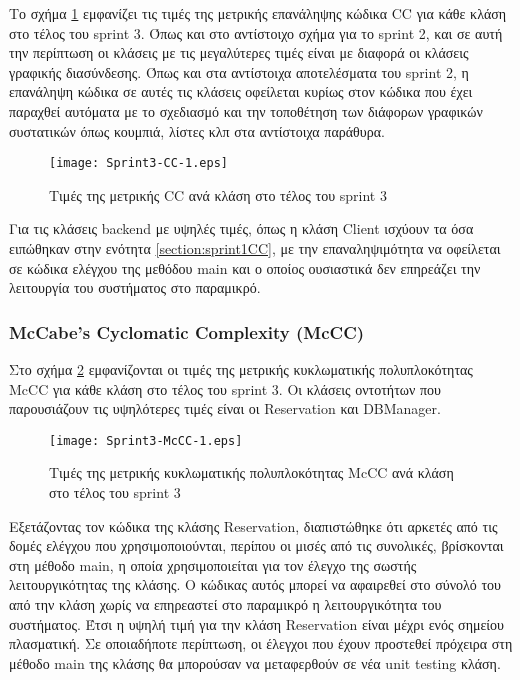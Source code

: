 Το σχήμα \ref{fig:sprint3CC} εμφανίζει τις τιμές της μετρικής επανάληψης
κώδικα CC για κάθε κλάση στο τέλος του sprint 3. Όπως και στο αντίστοιχο
σχήμα για το sprint 2, και σε αυτή την περίπτωση οι κλάσεις με τις
μεγαλύτερες τιμές είναι με διαφορά οι κλάσεις γραφικής διασύνδεσης. Όπως
και στα αντίστοιχα αποτελέσματα του sprint 2, η επανάληψη κώδικα σε
αυτές τις κλάσεις οφείλεται κυρίως στον κώδικα που έχει παραχθεί
αυτόματα με το σχεδιασμό και την τοποθέτηση των διάφορων γραφικών
συστατικών όπως κουμπιά, λίστες κλπ στα αντίστοιχα παράθυρα.

\begin{figure}
\centering
\texttt{[image: Sprint3-CC-1.eps]}
\caption{Τιμές της μετρικής CC ανά κλάση στο τέλος του sprint 3}
\label{fig:sprint3CC}
\end{figure}

Για τις κλάσεις backend με υψηλές τιμές, όπως η κλάση Client ισχύουν τα
όσα ειπώθηκαν στην ενότητα \ref{section:sprint1CC}, με την
επαναληψιμότητα να οφείλεται σε κώδικα ελέγχου της μεθόδου main και ο
οποίος ουσιαστικά δεν επηρεάζει την λειτουργία του συστήματος στο
παραμικρό.

\subsubsection{McCabe’s Cyclomatic Complexity (McCC)}
\label{section:sprint3McCC}

Στο σχήμα \ref{fig:sprint3McCC} εμφανίζονται οι τιμές της μετρικής
κυκλωματικής πολυπλοκότητας McCC για κάθε κλάση στο τέλος του sprint 3.
Οι κλάσεις οντοτήτων που παρουσιάζουν τις υψηλότερες τιμές είναι οι
Reservation και DBManager.

\begin{figure}
\centering
\texttt{[image: Sprint3-McCC-1.eps]}
\caption{Τιμές της μετρικής κυκλωματικής πολυπλοκότητας McCC ανά κλάση στο τέλος του sprint 3}
\label{fig:sprint3McCC}
\end{figure}

Εξετάζοντας τον κώδικα της κλάσης Reservation, διαπιστώθηκε ότι αρκετές
από τις δομές ελέγχου που χρησιμοποιούνται, περίπου οι μισές από τις
συνολικές, βρίσκονται στη μέθοδο main,
η οποία χρησιμοποιείται για τον έλεγχο της σωστής λειτουργικότητας της
κλάσης. Ο κώδικας αυτός μπορεί να αφαιρεθεί στο σύνολό του από την
κλάση χωρίς να επηρεαστεί στο παραμικρό η λειτουργικότητα του
συστήματος. Έτσι η υψηλή τιμή για την κλάση Reservation είναι μέχρι ενός
σημείου πλασματική. Σε οποιαδήποτε περίπτωση, οι έλεγχοι που έχουν
προστεθεί πρόχειρα στη μέθοδο main της κλάσης θα μπορούσαν να
μεταφερθούν σε νέα unit testing κλάση.

